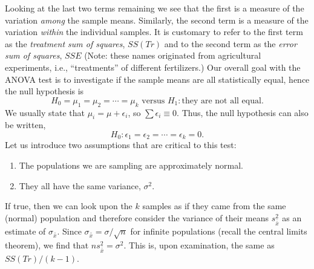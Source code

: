 Looking at the last two terms remaining we see that the first is a measure of the variation \emph{among} the sample 
means.  Similarly, the second term is a measure of the variation \emph{within} the individual samples.  It 
is customary to refer to the first term as the \emph{treatment sum of squares}, $SS(Tr)$
and to the second 
term as the \emph{error sum of squares}, $SSE$ (Note: these names originated from agricultural experiments, i.e., ``treatments'' of 
different fertilizers.)
Our overall goal with the ANOVA test is to investigate 
if the sample means are all statistically equal, hence the null hypothesis is
\[
H_0 = \mu_1 = \mu_2 = \cdots    = \mu_k \mbox{ versus } H_1: \mbox{they are not all equal}.
\]
We usually state that $\mu_i = \mu + \epsilon_i$, so  $\sum \epsilon_i \equiv 0$.  Thus, the null hypothesis can also be 
written,
$$
H_0: \epsilon_1 = \epsilon_2 = \cdots    = \epsilon_k = 0.
$$
Let us introduce two assumptions that are critical to this test:
\begin{enumerate}
\item The populations we are sampling are approximately normal.
\item They all have the same variance, $\sigma^2$.
\end{enumerate}
If true, then we can look upon the $k$ samples as if they came from the same (normal) population and 
therefore consider the variance of their means $s^2_{\bar{\bar{x}}}$  as an estimate of $\sigma_{\bar{\bar{x}}}$.
Since $\sigma_{\bar{\bar{x}}} = \sigma / \sqrt{n}$  for infinite 
populations (recall the central limits theorem), we find that $ns^2_{\bar{\bar{x}}} = \sigma^2$.
This is, upon examination, the same as $SS(Tr)/(k-1)$.

